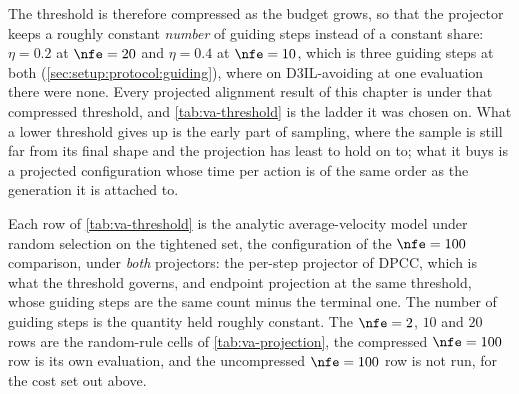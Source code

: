 The threshold is therefore compressed as the budget grows, so that the projector keeps a roughly constant
\emph{number} of guiding steps instead of a constant share: $\eta=0.2$ at $\nfe=20$ and $\eta=0.4$ at
$\nfe=10$, which is three guiding steps at both (\autoref{sec:setup:protocol:guiding}), where on
D3IL-avoiding at one evaluation there were none. Every projected alignment result of this chapter is under
that compressed threshold, and \autoref{tab:va-threshold} is the ladder it was chosen on. What a lower threshold gives up is the early part of sampling, where the sample is still
far from its final shape and the projection has least to hold on to; what it buys is a projected
configuration whose time per action is of the same order as the generation it is attached to.

Each row of \autoref{tab:va-threshold} is the analytic average-velocity model under random selection on
the tightened set, the configuration of the $\nfe=100$ comparison, under \emph{both} projectors: the
per-step projector of \ac{DPCC}, which is what the threshold governs, and endpoint projection at the same
threshold, whose guiding steps are the same count minus the terminal one. The number of guiding steps is
the quantity held roughly constant. The $\nfe=2$, $10$ and $20$ rows are the random-rule cells of
\autoref{tab:va-projection}, the compressed $\nfe=100$ row is its own evaluation, and the uncompressed
$\nfe=100$ row is not run, for the cost set out above.

